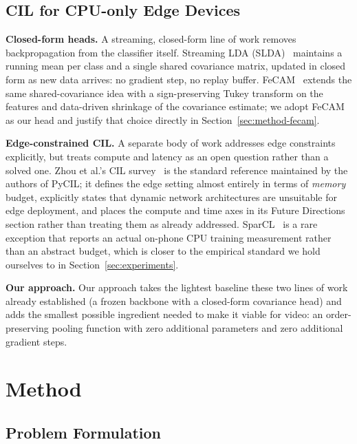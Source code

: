 \documentclass[a4paper,fleqn]{cas-dc}
\begin{document}
\subsection{CIL for CPU-only Edge Devices}

\textbf{Closed-form heads.} A streaming, closed-form line of work removes backpropagation from the
classifier itself. Streaming LDA (SLDA)~\cite{hayes2020slda} maintains a running mean
per class and a single shared covariance matrix, updated in closed form as
new data arrives: no gradient step, no replay buffer. FeCAM~\cite{goswami2023fecam}
extends the same shared-covariance idea with a sign-preserving Tukey
transform on the features and data-driven shrinkage of the covariance
estimate; we adopt FeCAM as our head and justify that choice directly in
Section~\ref{sec:method-fecam}.

\textbf{Edge-constrained CIL.} A separate body of work addresses edge constraints explicitly, but treats
compute and latency as an open question rather than a solved one. Zhou et
al.'s CIL survey~\cite{zhou2024cilsurvey} is the standard reference
maintained by the authors of PyCIL; it defines the edge setting almost
entirely in terms of \emph{memory} budget, explicitly states that dynamic
network architectures are unsuitable for edge deployment, and places the
compute and time axes in its Future Directions section rather than treating
them as already addressed. SparCL~\cite{wang2022sparcl} is a rare exception that
reports an actual on-phone CPU training measurement rather than an abstract
budget, which is closer to the empirical standard we hold ourselves to in
Section~\ref{sec:experiments}.

\textbf{Our approach.} Our approach takes the lightest baseline these two lines of work already
established (a frozen backbone with a closed-form covariance head) and
adds the smallest possible ingredient needed to make it viable for video:
an order-preserving pooling function with zero additional parameters and
zero additional gradient steps.


\section{Method}
\label{sec:method}

\subsection{Problem Formulation}
\label{sec:method-formulation}
\end{document}
